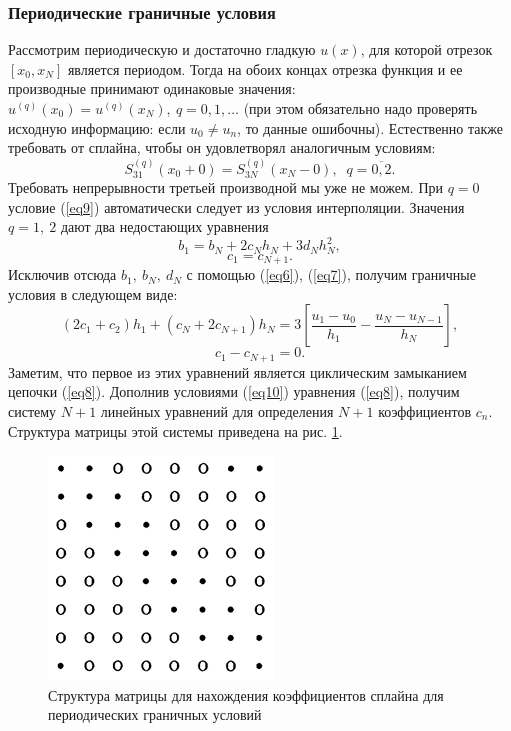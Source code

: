 \documentclass[
11pt,
master, %
subf, %
href, %
colorlinks=true, %
times, %
]{disser}
\begin{document}
\subsubsection{Периодические граничные условия}
Рассмотрим периодическую и достаточно гладкую $u(x)$, для которой отрезок $[x_0,x_N]$ является периодом. Тогда на обоих концах отрезка функция и ее производные принимают одинаковые значения: $u^{(q)}(x_0)=u^{(q)}(x_N), ~ q=0,1,\ldots$ (при этом обязательно надо проверять исходную информацию: если $u_0\neq u_n$, то данные ошибочны). Естественно также требовать от сплайна, чтобы он удовлетворял аналогичным условиям:
\begin{equation}\label{eq9}
  S^{(q)}_{31}(x_0+0) = S^{(q)}_{3N}(x_N-0),\;\;q=\overline{0, 2}.
\end{equation}
Требовать непрерывности третьей производной мы уже не можем. При $q = 0$ условие (\ref{eq9}) автоматически следует из условия интерполяции. Значения $q = 1, ~ 2$ дают два недостающих уравнения
$$b_1 = b_N + 2c_N h_N + 3d_N h_N^2,$$
$$c_1 = c_{N+1}.$$
Исключив отсюда $b_1,~ b_N, ~ d_N$ с помощью (\ref{eq6}), (\ref{eq7}), получим граничные условия в следующем виде:
\begin{equation}\label{eq10}
  (2c_1+c_2)h_1 + (c_N+2c_{N+1})h_N = 3\left[\frac{u_1-u_0}{h_1}-\frac{u_N-u_{N-1}}{h_N}\right],
\end{equation}
$$c_1-c_{N+1}=0.$$
Заметим, что первое из этих уравнений является циклическим замыканием цепочки (\ref{eq8}). Дополнив условиями (\ref{eq10}) уравнения (\ref{eq8}), получим систему $N + 1$ линейных уравнений для определения $N + 1$ коэффициентов $c_n$. Структура матрицы этой системы приведена на рис. \ref{ris:1}.

\begin{figure}[h]
  \centering
  \includegraphics{Matrix.png}
  \caption{Структура матрицы для нахождения коэффициентов сплайна для периодических граничных условий}
  \label{ris:1}
\end{figure}
\end{document}
